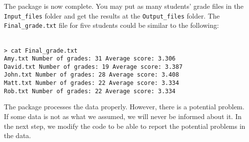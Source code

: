 \vspace{5mm}
\noindent
The package is now complete. You may put as many students' grade files in the \texttt{Input\_files} folder and get the results at the \texttt{Output\_files} folder. The \texttt{Final\_grade.txt} file for five students could be similar to the following:
\vspace{5mm}
\begin{mdframed}[hidealllines=true,backgroundcolor=gray!20]
\begin{singlespace}
\fontsize{10pt}{1pt}
\texttt{
\\
> cat Final\_grade.txt \\
Amy.txt \phantom{x}\hspace{3ex}     Number of grades:  31  Average score:  3.306 \\
David.txt \phantom{x}\hspace{1ex}   Number of grades:  19  Average score:  3.387 \\
John.txt \phantom{x}\hspace{2ex}    Number of grades:  28  Average score:  3.408 \\
Matt.txt \phantom{x}\hspace{2ex}    Number of grades:  22  Average score:  3.334 \\
Rob.txt  \phantom{x}\hspace{3ex}     Number of grades:  22  Average score:  3.334 \\
 }
\end{singlespace}
\end{mdframed}
\noindent
The package processes the data properly. However, there is a potential problem. If some data is not as what we assumed, we will never be informed about it. In the next step, we modify the code to be able to report the potential problems in the data.\\


